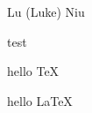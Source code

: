 \documentclass[12pt,a4paper]{report}
\newcommand{\myname}{Lu (Luke) Niu}
\begin{document}
\myname

test

hello \TeX

hello \LaTeX 
\end{document}

